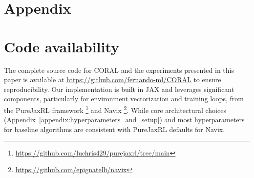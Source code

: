 \documentclass[letterpaper]{article}
\begin{document}
\begin{appendix}
\setcounter{secnumdepth}{2}
\section*{Appendix}
\section{Code availability}
\label{appendix:code_availability}
The complete source code for CORAL and the experiments presented in this paper is available at \url{https://github.com/fernando-ml/CORAL} to ensure reproducibility. Our implementation is built in JAX \cite{jax2018github} and leverages significant components, particularly for environment vectorization and training loops, from the PureJaxRL framework \cite{lu2022discovered}\footnote{\url{https://github.com/luchris429/purejaxrl/tree/main}} and Navix \cite{pignatelli2024navix}\footnote{\url{https://github.com/epignatelli/navix}}. While core architectural choices (Appendix~\ref{appendix:hyperparameters_and_setup}) and most hyperparameters for baseline algorithms are consistent with PureJaxRL defaults for Navix.

\end{appendix}
\end{document}
